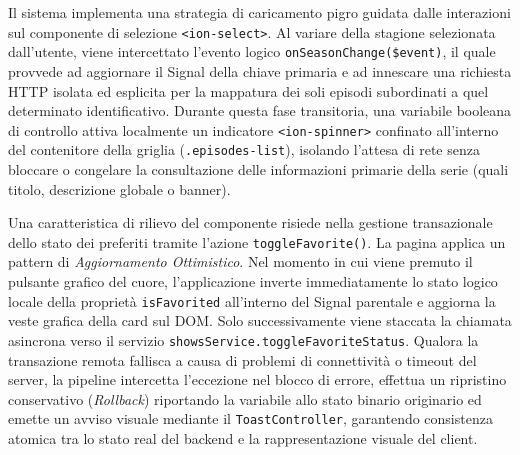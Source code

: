 \documentclass[11pt,a4paper]{article}
\begin{document}
\begin{itemize}
    Il sistema implementa una strategia di caricamento pigro guidata dalle interazioni sul componente di selezione \texttt{<ion-select>}. Al variare della stagione selezionata dall'utente, viene intercettato l'evento logico \texttt{onSeasonChange(\$event)}, il quale provvede ad aggiornare il Signal della chiave primaria e ad innescare una richiesta HTTP isolata ed esplicita per la mappatura dei soli episodi subordinati a quel determinato identificativo. Durante questa fase transitoria, una variabile booleana di controllo attiva localmente un indicatore \texttt{<ion-spinner>} confinato all'interno del contenitore della griglia (\texttt{.episodes-list}), isolando l'attesa di rete senza bloccare o congelare la consultazione delle informazioni primarie della serie (quali titolo, descrizione globale o banner).
    
    Una caratteristica di rilievo del componente risiede nella gestione transazionale dello stato dei preferiti tramite l'azione \texttt{toggleFavorite()}. La pagina applica un pattern di \textit{Aggiornamento Ottimistico}. Nel momento in cui viene premuto il pulsante grafico del cuore, l'applicazione inverte immediatamente lo stato logico locale della proprietà \texttt{isFavorited} all'interno del Signal parentale e aggiorna la veste grafica della card sul DOM. Solo successivamente viene staccata la chiamata asincrona verso il servizio \texttt{showsService.toggleFavoriteStatus}. Qualora la transazione remota fallisca a causa di problemi di connettività o timeout del server, la pipeline intercetta l'eccezione nel blocco di errore, effettua un ripristino conservativo (\textit{Rollback}) riportando la variabile allo stato binario originario ed emette un avviso visuale mediante il \texttt{ToastController}, garantendo consistenza atomica tra lo stato real del backend e la rappresentazione visuale del client.
\end{itemize}
\end{document}

